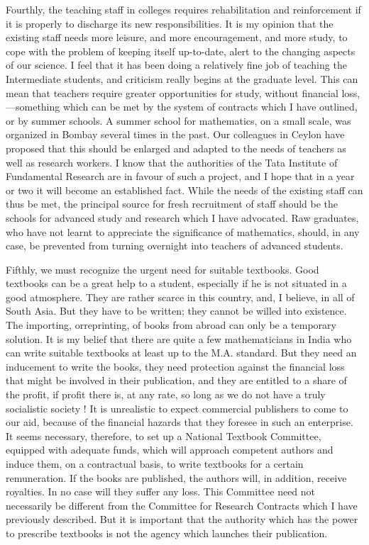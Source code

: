 Fourthly, the teaching staff in colleges requires rehabilitation and reinforcement if it is properly to discharge its new responsibilities. It is my opinion that the existing staff needs more leisure, and more encouragement, and more study, to cope with the problem of keeping itself up-to-date, alert to the changing aspects of our science. I feel that it has been doing a relatively fine job of teaching the Intermediate students, and criticism really begins at the graduate level. This can mean that teachers require greater opportunities for study, without financial loss,---something which can be met by the system of contracts which I have outlined, or by summer schools. A summer school for mathematics, on a small scale, was organized in Bombay several times in the past. Our colleagues in Ceylon have proposed that this should be enlarged and adapted to the needs of teachers as well as research workers. I know that the authorities of the Tata Institute of Fundamental Research are in favour of such a project, and I hope that in a year or two it will become an established fact. While the needs of the existing staff can thus be met, the principal source for fresh recruitment of staff should be the schools for advanced study and research which I have advocated. Raw graduates, who have not learnt to appreciate the significance of mathematics, should, in any case, be prevented from turning overnight into teachers of advanced students.

Fifthly, we must recognize the urgent need for suitable textbooks. Good textbooks can be a great help to a student, especially if he is not situated in a good atmosphere. They are rather scarce in this country, and, I believe, in all of South Asia. But they have to be written; they cannot be willed into existence. The importing, or\pageoriginale reprinting, of books from abroad can only be a temporary solution. It is my belief that there are quite a few mathematicians in India who can write suitable textbooks at least up to the M.A. standard. But they need an inducement to write the books, they need protection against the financial loss that might be involved in their publication, and they are entitled to a share of the profit, if profit there is, at any rate, so long as we do not have a truly socialistic society ! It is unrealistic to expect commercial publishers to come to our aid, because of the financial hazards that they foresee in such an enterprise. It seems necessary, therefore, to set up a National Textbook Committee, equipped with adequate funds, which will approach competent authors and induce them, on a contractual basis, to write textbooks for a certain remuneration. If the books are published, the authors will, in addition, receive royalties. In no case will they suffer any loss. This Committee need not necessarily be different from the Committee for Research Contracts which I have previously described. But it is important that the authority which has the power to prescribe textbooks is not the agency which launches their publication.

